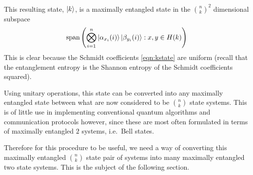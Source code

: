This resulting state, $\ket{k}$,  is a maximally entangled state in the $\binom{n}{k}^2$ dimensional subspace 
$$\text{span}\left(\bigotimes_{i=1}^n 
\ket{\alpha_{x_i}(i)} \ket{\beta_{y_i}(i)}: x,y \in H(k)\right)
$$
This is clear because the Schmidt coefficients \eqref{eqn:kstate} are uniform (recall that the entanglement entropy is the Shannon entropy of the Schmidt coefficients squared).

Using unitary operations, this state can be converted into any maximally entangled state between what are now considered to be $\binom{n}{k}$ state systems.
This is of little use in implementing conventional quantum algorithms and communication protocols however, since these are most often formulated in terms of maximally entangled $2$ systems, i.e.\ Bell states.

Therefore for this procedure to be useful, we need a way of converting this maximally entangled $\binom{n}{k}$ state pair of systems into many maximally entangled two state systems. This is the subject of the following section.

